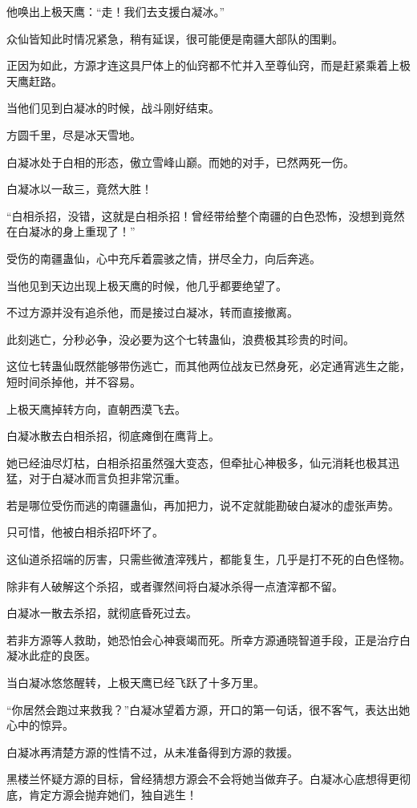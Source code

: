 \begin{this_body}
他唤出上极天鹰：“走！我们去支援白凝冰。”

众仙皆知此时情况紧急，稍有延误，很可能便是南疆大部队的围剿。

正因为如此，方源才连这具尸体上的仙窍都不忙并入至尊仙窍，而是赶紧乘着上极天鹰赶路。

当他们见到白凝冰的时候，战斗刚好结束。

方圆千里，尽是冰天雪地。

白凝冰处于白相的形态，傲立雪峰山巅。而她的对手，已然两死一伤。

白凝冰以一敌三，竟然大胜！

“白相杀招，没错，这就是白相杀招！曾经带给整个南疆的白色恐怖，没想到竟然在白凝冰的身上重现了！”

受伤的南疆蛊仙，心中充斥着震骇之情，拼尽全力，向后奔逃。

当他见到天边出现上极天鹰的时候，他几乎都要绝望了。

不过方源并没有追杀他，而是接过白凝冰，转而直接撤离。

此刻逃亡，分秒必争，没必要为这个七转蛊仙，浪费极其珍贵的时间。

这位七转蛊仙既然能够带伤逃亡，而其他两位战友已然身死，必定通宵逃生之能，短时间杀掉他，并不容易。

上极天鹰掉转方向，直朝西漠飞去。

白凝冰散去白相杀招，彻底瘫倒在鹰背上。

她已经油尽灯枯，白相杀招虽然强大变态，但牵扯心神极多，仙元消耗也极其迅猛，对于白凝冰而言负担非常沉重。

若是哪位受伤而逃的南疆蛊仙，再加把力，说不定就能勘破白凝冰的虚张声势。

只可惜，他被白相杀招吓坏了。

这仙道杀招端的厉害，只需些微渣滓残片，都能复生，几乎是打不死的白色怪物。

除非有人破解这个杀招，或者骤然间将白凝冰杀得一点渣滓都不留。

白凝冰一散去杀招，就彻底昏死过去。

若非方源等人救助，她恐怕会心神衰竭而死。所幸方源通晓智道手段，正是治疗白凝冰此症的良医。

当白凝冰悠悠醒转，上极天鹰已经飞跃了十多万里。

“你居然会跑过来救我？”白凝冰望着方源，开口的第一句话，很不客气，表达出她心中的惊异。

白凝冰再清楚方源的性情不过，从未准备得到方源的救援。

黑楼兰怀疑方源的目标，曾经猜想方源会不会将她当做弃子。白凝冰心底想得更彻底，肯定方源会抛弃她们，独自逃生！


\end{this_body}
